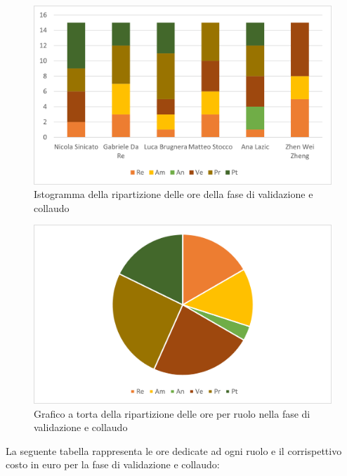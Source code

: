 \begin{figure}[H]
    \centering
    \includegraphics[scale=0.6]{img/grafi preventivo/istogrammi/validazione/complessivo.png}
    \caption{Istogramma della ripartizione delle ore della fase di validazione e collaudo}
\end{figure}
\begin{figure}[H]
    \centering
    \includegraphics[scale=0.6]{img/grafi preventivo/torta/validazione/complessivo.png}
    \caption{Grafico a torta della ripartizione delle ore per ruolo nella fase di validazione e collaudo}
\end{figure}
La seguente tabella rappresenta le ore dedicate ad ogni ruolo e il corrispettivo costo in euro per la fase di validazione e collaudo:

